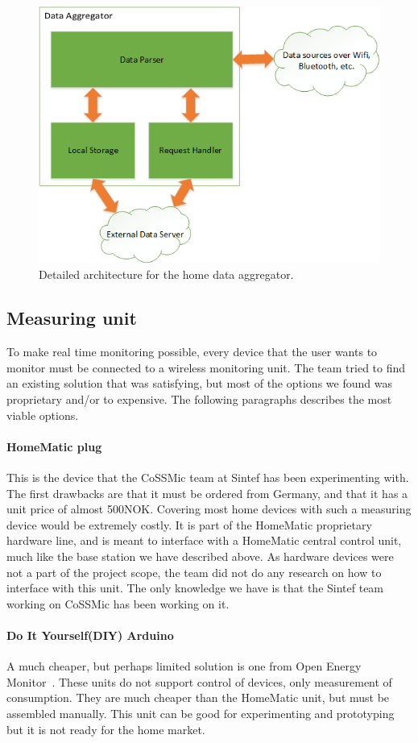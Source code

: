 \begin{figure}[H]
\centering
\includegraphics[height=0.4\textheight]{ch/further/fig/home.png}
\caption{Detailed architecture for the home data aggregator.}
\label{fig:aggregator}
\end{figure}

\subsection{Measuring unit}
To make real time monitoring possible, every device that the user wants to monitor must be connected to a wireless monitoring unit. The team tried to find an existing solution that was satisfying, but most of the options we found was proprietary and/or to expensive. The following paragraphs describes the most viable options.

\paragraph{HomeMatic plug}
This is the device that the CoSSMic team at Sintef has been experimenting with. The first drawbacks are that it must be ordered from Germany, and that it has a unit price of almost 500NOK. Covering most home devices with such a measuring device would be extremely costly. It is part of the HomeMatic proprietary hardware line, and is meant to interface with a HomeMatic central control unit, much like the base station we have described above. As hardware devices were not a part of the project scope, the team did not do any research on how to interface with this unit. The only knowledge we have is that the Sintef team working on CoSSMic has been working on it.

\paragraph{Do It Yourself(DIY) Arduino}
A much cheaper, but perhaps limited solution is one from Open Energy Monitor~\cite{oemmodule}. These units do not support control of devices, only measurement of consumption. They are much cheaper than the HomeMatic unit, but must be assembled manually. This unit can be good for experimenting and prototyping but it is not ready for the home market.